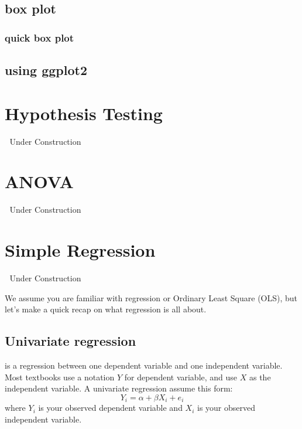 \documentclass[
]{book}
\begin{document}
\hypertarget{box-plot}{%
\section{box plot}\label{box-plot}}

\hypertarget{quick-box-plot}{%
\subsection{quick box plot}\label{quick-box-plot}}

\hypertarget{using-ggplot2}{%
\section{using ggplot2}\label{using-ggplot2}}

\hypertarget{hypothesis-testing}{%
\chapter{Hypothesis Testing}\label{hypothesis-testing}}

🚧 Under Construction 🚧

\hypertarget{anova}{%
\chapter{ANOVA}\label{anova}}

🚧 Under Construction 🚧

\hypertarget{simple-regression}{%
\chapter{Simple Regression}\label{simple-regression}}

🚧 Under Construction 🚧

We assume you are familiar with regression or Ordinary Least Square (OLS), but let's make a quick recap on what regression is all about.

\hypertarget{univariate-regression}{%
\section{Univariate regression}\label{univariate-regression}}

is a regression between one dependent variable and one independent variable. Most textbooks use a notation \(Y\) for dependent variable, and use \(X\) as the independent variable. A univariate regression assume this form:
\[
Y_i=\alpha+\beta X_i+ e_i
\]
where \(Y_i\) is your observed dependent variable and \(X_i\) is your observed independent variable.
\end{document}
